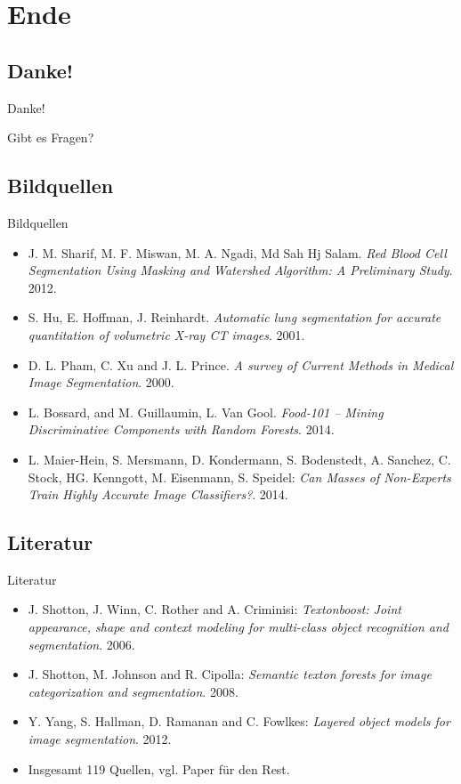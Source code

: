 \section{Ende}
\subsection{Danke!}
\begin{frame}{Danke!}
    \begin{center}
        \Huge
	    Gibt es Fragen?
    \end{center}
\end{frame}

\subsection{Bildquellen}
\begin{frame}{Bildquellen}
\begin{itemize}
	\item J. M. Sharif, M. F. Miswan, M. A. Ngadi, Md Sah Hj Salam.
          \textit{Red Blood Cell Segmentation Using Masking and Watershed Algorithm: A Preliminary Study}. 2012.
    \item S. Hu, E. Hoffman, J. Reinhardt. \textit{Automatic lung segmentation for accurate quantitation of volumetric X-ray CT images}. 2001.
    \item D. L. Pham, C. Xu and J. L. Prince. \textit{A survey of Current Methods in Medical Image Segmentation}. 2000.
    \item L. Bossard, and M. Guillaumin, L. Van Gool. \textit{Food-101 -- Mining Discriminative Components with Random Forests}. 2014.
    \item L. Maier-Hein, S. Mersmann, D. Kondermann, S. Bodenstedt, A. Sanchez, C. Stock, HG. Kenngott, M. Eisenmann, S. Speidel: \textit{Can Masses of Non-Experts Train Highly Accurate Image Classifiers?}. 2014.
\end{itemize}
\end{frame}

\subsection{Literatur}
\begin{frame}{Literatur}
\begin{itemize}
    \item J. Shotton, J. Winn, C. Rother and  A. Criminisi: \textit{Textonboost: Joint appearance, shape and context modeling for multi-class object recognition and segmentation}. 2006.
    \item J. Shotton, M. Johnson and R. Cipolla: \textit{Semantic texton forests for image categorization and segmentation}. 2008.
    \item Y. Yang, S. Hallman, D. Ramanan and C. Fowlkes: \textit{Layered object models for image segmentation}. 2012.
    \item Insgesamt 119 Quellen, vgl. Paper für den Rest.
\end{itemize}
\end{frame}

